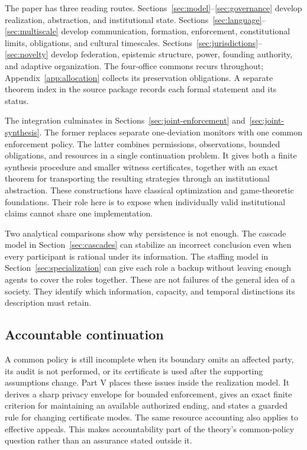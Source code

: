 \documentclass[11pt,letterpaper]{article}
\theoremstyle{plain}
\theoremstyle{definition}
\theoremstyle{remark}
\begin{document}
The paper has three reading routes. Sections~\ref{sec:model}--\ref{sec:governance} develop realization, abstraction, and institutional state. Sections~\ref{sec:language}--\ref{sec:multiscale} develop communication, formation, enforcement, constitutional limits, obligations, and cultural timescales. Sections~\ref{sec:jurisdictions}--\ref{sec:novelty} develop federation, epistemic structure, power, founding authority, and adaptive organization. The four-office commons recurs throughout; Appendix~\ref{app:allocation} collects its preservation obligations. A separate theorem index in the source package records each formal statement and its status.

The integration culminates in Sections~\ref{sec:joint-enforcement} and~\ref{sec:joint-synthesis}. The former replaces separate one-deviation monitors with one common enforcement policy. The latter combines permissions, observations, bounded obligations, and resources in a single continuation problem. It gives both a finite synthesis procedure and smaller witness certificates, together with an exact theorem for transporting the resulting strategies through an institutional abstraction. These constructions have classical optimization and game-theoretic foundations. Their role here is to expose when individually valid institutional claims cannot share one implementation.

Two analytical comparisons show why persistence is not enough. The cascade model in Section~\ref{sec:cascades} can stabilize an incorrect conclusion even when every participant is rational under its information. The staffing model in Section~\ref{sec:specialization} can give each role a backup without leaving enough agents to cover the roles together. These are not failures of the general idea of a society. They identify which information, capacity, and temporal distinctions its description must retain.

\subsection{Accountable continuation}
A common policy is still incomplete when its boundary omits an affected party, its audit is not performed, or its certificate is used after the supporting assumptions change. Part V places these issues inside the realization model. It derives a sharp privacy envelope for bounded enforcement, gives an exact finite criterion for maintaining an available authorized ending, and states a guarded rule for changing certificate modes. The same resource accounting also applies to effective appeals. This makes accountability part of the theory's common-policy question rather than an assurance stated outside it.
\end{document}

